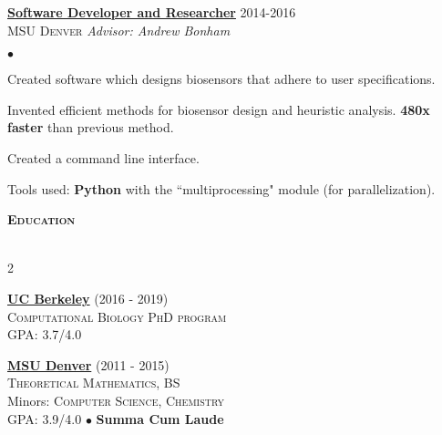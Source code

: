 \documentclass{article}
\newcommand{\lineunder}{\vspace*{-8pt} \\ \hspace*{-18pt} \hrulefill \\}
\newcommand{\header}[1]{{\vspace*{8pt}\hspace*{-16pt} \textsc{\textbf{\large{#1}}}} \vspace*{4pt} \lineunder \vspace*{4pt}}
\newcommand{\experience}[4]{{\vspace{-2pt}\bf{\underline{#1}}} \hfill  #2\\{\textsc{#3} \hfill \emph{#4}\\  }}
\newcommand{\school}[4]{
 \textbf{\underline{#1}} (#3)
 \\ \vspace{3pt} \textsc{#2} 
 \\   #4
\vspace{5pt}
}
\newcommand{\schooltwo}[6]{
    \textbf{\underline{#1}} (#3) 
    \\ \vspace{3pt} \textsc{#2, BS} 
    \\ Minors: \textsc{#5}
    \\  #4 $\bullet$ \textbf{#6}
    \vspace{3pt}
}
\newenvironment{achievements}{\begin{list}{$\bullet$}{\topsep 0pt \itemsep -2pt}}{\vspace*{4pt}\end{list}}
\begin{document}
    
\experience{Software Developer and Researcher}{2014-2016}{MSU Denver}{Advisor: Andrew Bonham}
\begin{achievements}
    \item Created software which designs biosensors that adhere to user specifications.
    \item Invented efficient methods for biosensor design and heuristic analysis. \textbf{480x faster} than previous method.
    \item Created a command line interface.
    \item Tools used: \textbf{Python} with the ``multiprocessing" module (for parallelization).
\end{achievements}





\vspace{-5pt}
\header{Education}
\vspace{-14pt}
\begin{multicols}{2}
    
\school{UC Berkeley}{Computational Biology PhD program}{2016 - 2019}{GPA: 3.7/4.0}

\columnbreak
\schooltwo{MSU Denver}{Theoretical Mathematics}{2011 - 2015}{GPA: 3.9/4.0}{Computer Science, Chemistry}{Summa Cum Laude}

\end{multicols}
\end{document}
